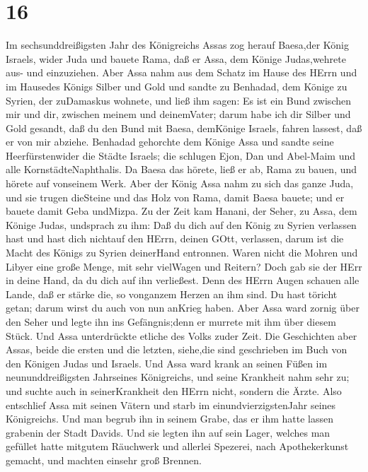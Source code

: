 \hypertarget{section-15}{%
\section{16}\label{section-15}}

 Im sechsunddreißigsten Jahr des Königreichs Assas zog
herauf Baesa,der König Israels, wider Juda und bauete Rama, daß er Assa,
dem Könige Judas,wehrete aus- und einzuziehen.  Aber Assa
nahm aus dem Schatz im Hause des HErrn und im Hausedes Königs Silber und
Gold und sandte zu Benhadad, dem Könige zu Syrien, der zuDamaskus
wohnete, und ließ ihm sagen:  Es ist ein Bund zwischen mir
und dir, zwischen meinem und deinemVater; darum habe ich dir Silber und
Gold gesandt, daß du den Bund mit Baesa, demKönige Israels, fahren
lassest, daß er von mir abziehe.  Benhadad gehorchte dem
Könige Assa und sandte seine Heerfürstenwider die Städte Israels; die
schlugen Ejon, Dan und Abel-Maim und alle KornstädteNaphthalis.
 Da Baesa das hörete, ließ er ab, Rama zu bauen, und hörete
auf vonseinem Werk.  Aber der König Assa nahm zu sich das
ganze Juda, und sie trugen dieSteine und das Holz von Rama, damit Baesa
bauete; und er bauete damit Geba undMizpa.  Zu der Zeit kam
Hanani, der Seher, zu Assa, dem Könige Judas, undsprach zu ihm: Daß du
dich auf den König zu Syrien verlassen hast und hast dich nichtauf den
HErrn, deinen GOtt, verlassen, darum ist die Macht des Königs zu Syrien
deinerHand entronnen.  Waren nicht die Mohren und Libyer
eine große Menge, mit sehr vielWagen und Reitern? Doch gab sie der HErr
in deine Hand, da du dich auf ihn verließest.  Denn des
HErrn Augen schauen alle Lande, daß er stärke die, so vonganzem Herzen
an ihm sind. Du hast töricht getan; darum wirst du auch von nun anKrieg
haben.  Aber Assa ward zornig über den Seher und legte ihn
ins Gefängnis;denn er murrete mit ihm über diesem Stück. Und Assa
unterdrückte etliche des Volks zuder Zeit.  Die Geschichten
aber Assas, beide die ersten und die letzten, siehe,die sind geschrieben
im Buch von den Königen Judas und Israels.  Und Assa ward
krank an seinen Füßen im neununddreißigsten Jahrseines Königreichs, und
seine Krankheit nahm sehr zu; und suchte auch in seinerKrankheit den
HErrn nicht, sondern die Ärzte.  Also entschlief Assa mit
seinen Vätern und starb im einundvierzigstenJahr seines Königreichs.
 Und man begrub ihn in seinem Grabe, das er ihm hatte
lassen grabenin der Stadt Davids. Und sie legten ihn auf sein Lager,
welches man gefüllet hatte mitgutem Räuchwerk und allerlei Spezerei,
nach Apothekerkunst gemacht, und machten einsehr groß Brennen.

